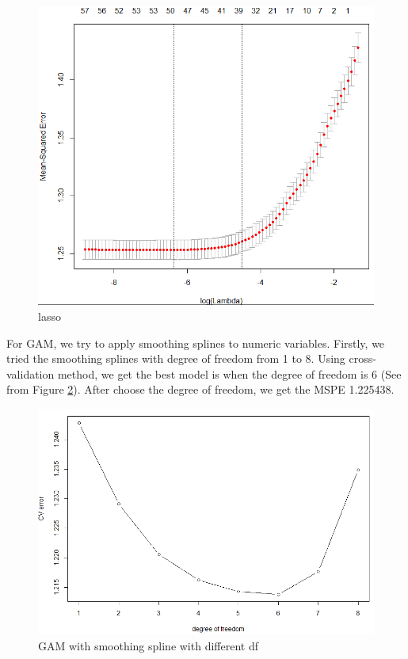 \documentclass[11pt]{article}
\begin{document}
    \begin{figure}[h]
        \centering
        \includegraphics[width=0.8\linewidth]{lasso_plot.png}
        \caption{lasso}
        \label{fig:lasso}
    \end{figure}
    
For GAM, we try to apply smoothing splines to numeric variables. Firstly, we tried the smoothing splines with degree of freedom from 1 to 8. Using cross-validation method, we get the best model is when the degree of freedom is 6 (See from Figure \ref{fig:gam}). After choose the degree of freedom, we get the MSPE 1.225438. \\ 

    \begin{figure}[h]
        \centering
        \includegraphics[width=0.9\linewidth]{gam_plot.png}
        \caption{GAM with smoothing spline with different df}
        \label{fig:gam}
    \end{figure}
\end{document}
